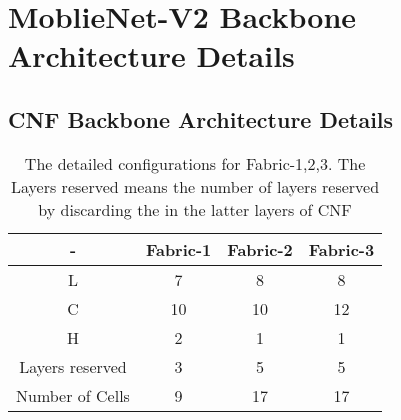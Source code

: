 \documentclass[journal]{IEEEtran}
\begin{document}
\section{MoblieNet-V2 Backbone Architecture Details}

\subsection{CNF Backbone Architecture Details}
\begin{table}[h]
	\renewcommand{\arraystretch}{1.3}
	\label{cnf_backbone}
	\caption{The detailed configurations for Fabric-1,2,3. The Layers reserved means the number of layers reserved by discarding the in the latter layers of CNF}
\centering

\begin{tabular}{c|c|c|c}
	\toprule[0.2em]
	
- &Fabric-1&Fabric-2&Fabric-3\\
\toprule[0.2em]
L&	7&8& 8\\
C& 10& 10&12\\
H& 2 & 1 & 1\\
Layers reserved& 3&5&5\\
Number of Cells  & 9 &17&17\\

	\toprule[0.2em]
\end{tabular}
\end{table}
	
\end{document}
